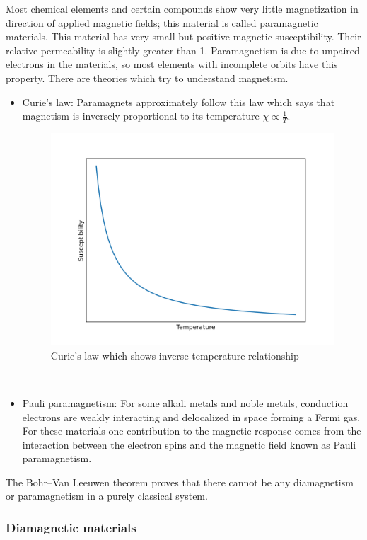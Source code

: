 Most chemical elements and certain compounds show very little magnetization in direction of applied magnetic fields; this material is called paramagnetic materials. This material has very small but positive magnetic susceptibility. Their relative permeability is slightly greater than 1. Paramagnetism is due to unpaired electrons in the materials, so most elements with incomplete orbits have this property. There are theories which try to understand magnetism. 
\begin{itemize}
\item Curie’s law: Paramagnets approximately follow this law which says that magnetism is inversely proportional to its temperature $\chi \propto \frac{1}{T}$.
\begin{figure}[hbt!]\centering
  \includegraphics[width=0.9\linewidth]{inverse.png}
  \caption{Curie's law which shows inverse temperature relationship}
\end{figure}
\\
\item Pauli paramagnetism: For some alkali metals and noble metals, conduction electrons are weakly interacting and delocalized in space forming a Fermi gas. For these materials one contribution to the magnetic response comes from the interaction between the electron spins and the magnetic field known as Pauli paramagnetism. \cite{wikipara}

\end{itemize}

The Bohr–Van Leeuwen theorem proves that there cannot be any diamagnetism or paramagnetism in a purely classical system.\cite{wikipara}

\subsubsection{Diamagnetic materials}

